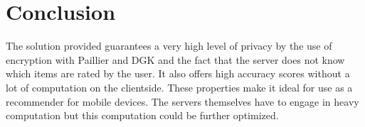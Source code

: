 \documentclass[twocolumn]{phdsymp} %
\begin{document}
 
\section{Conclusion}

The solution provided guarantees a very high level of privacy by the use of encryption with Paillier and DGK and the fact that the server does not know which items are rated by the user. It also offers high accuracy scores without a lot of computation on the clientside. These properties make it ideal for use as a recommender for mobile devices. The servers themselves have to engage in heavy computation but this computation could be further optimized.








\nocite{*}

\end{document}
